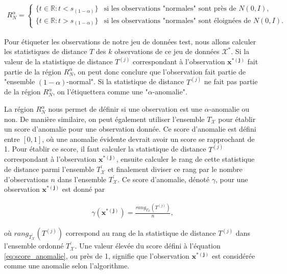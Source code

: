 \begin{gather*} \label{eq:region}
	R_{N}^{\alpha} = 
	\begin{cases} 
		\big\{t \in \mathbb{R}: t < s_{(1 - \alpha)} \big\} & \text{si les observations "normales" sont près de $N(0, I)$}, \\
		\big\{t \in \mathbb{R}: t > s_{(1 - \alpha)} \big\} & \text{si les observations "normales" sont éloignées de $N(0, I)$}.
	\end{cases}
\end{gather*}

Pour étiqueter les observations de notre jeu de données test, nous allons calculer les statistiques de distance $T$ des $k$ observations de ce jeu de données $\mathcal{X^*}$. Si la valeur de la statistique de distance $T^{(j)}$ correspondant à l'observation $\boldsymbol{x^{*(j)}}$ fait partie de la région $R_{N}^{\alpha}$, on peut donc conclure que l'observation fait partie de "ensemble $(1-\alpha)$-normal". Si la statistique de distance $T^{(j)}$ ne fait pas partie de la région $R_{N}^{\alpha}$, on l'étiquettera comme une "$\alpha$-anomalie".

La région $R_{N}^{\alpha}$ nous permet de définir si une observation est une $\alpha$-anomalie ou non. De manière similaire, on peut également utiliser l'ensemble $T_{\mathcal{X}}$ pour établir un score d'anomalie pour une observation donnée. Ce score d'anomalie est défini entre $[0,1]$, où une anomalie évidente devrait avoir un score se rapprochant de 1. Pour établir ce score, il faut calculer la statistique de distance $T^{(j)}$ correspondant à l'observation $\boldsymbol{x^{*(j)}}$, ensuite calculer le rang de cette statistique de distance parmi l'ensemble $T^{'}_{\mathcal{X}}$ et finalement diviser ce rang par le nombre d'observations $n$ dans l'ensemble $T^{'}_{\mathcal{X}}$. Ce score d'anomalie, dénoté $\gamma$, pour une observation $\boldsymbol{x^{*(j)}}$ est donné par

\begin{gather} \label{eq:score_anomalie}
	\gamma(\boldsymbol{x^{*(j)}}) = \frac{rang_{T^{'}_{\mathcal{X}}}(T^{(j)})}{n},
\end{gather}

où $rang_{T^{'}_{\mathcal{X}}}(T^{(j)})$ correspond au rang de la statistique de distance $T^{(j)}$ dans l'ensemble ordonné $T^{'}_{\mathcal{X}}$. Une valeur élevée du score défini à l'équation \ref{eq:score_anomalie}, ou près de 1, signifie que l'observation $\boldsymbol{x^{*(j)}}$ est considérée comme une anomalie selon l'algorithme.

